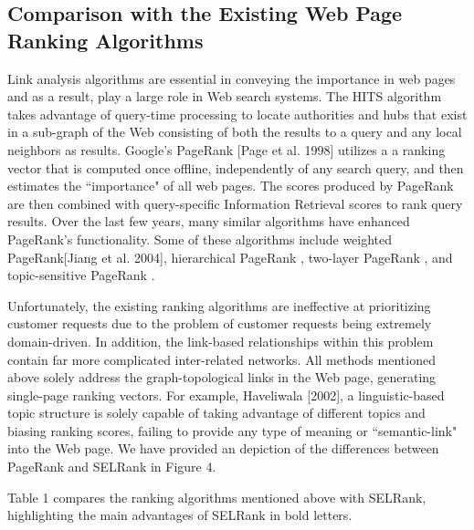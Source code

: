 \documentclass[sigconf]{acmart}
\begin{document}
\subsection{Comparison with the Existing Web Page Ranking Algorithms}
Link analysis algorithms are essential in conveying the importance in web pages and as a result, play a large role in Web search systems. The HITS algorithm \cite{Kleinberg:1999:ASH:324133.324140}takes advantage of query-time processing to locate authorities and hubs that exist in a sub-graph of the Web consisting of both the results to a query and any local neighbors as results. Google's PageRank [Page et al. 1998] utilizes a a ranking vector that is computed once offline, independently of any search query, and then estimates the ``importance" of all web pages. The scores produced by PageRank are then combined with query-specific Information Retrieval scores to rank query results. Over the last few years, many similar algorithms have enhanced PageRank's functionality. Some of these algorithms include weighted PageRank[Jiang et al. 2004], hierarchical PageRank , two-layer PageRank \cite{Wu:2005:ULM:1068511.1069402}, and topic-sensitive PageRank \cite{Haveliwala:2002:TP:511446.511513}.

Unfortunately, the existing ranking algorithms are ineffective at prioritizing customer requests due to the problem of customer requests being extremely domain-driven. In addition, the link-based relationships within this problem contain far more complicated inter-related networks. All methods mentioned above solely address the graph-topological links in the Web page, generating single-page ranking vectors. For example, Haveliwala [2002], a linguistic-based topic structure is solely capable of taking advantage of different topics and biasing ranking scores, failing to provide any type of meaning or ``semantic-link" into the Web page. We have provided an depiction of the differences between PageRank and SELRank in Figure 4.

Table 1 compares the ranking algorithms mentioned above with SELRank, highlighting the main advantages of SELRank in bold letters.
\end{document}
